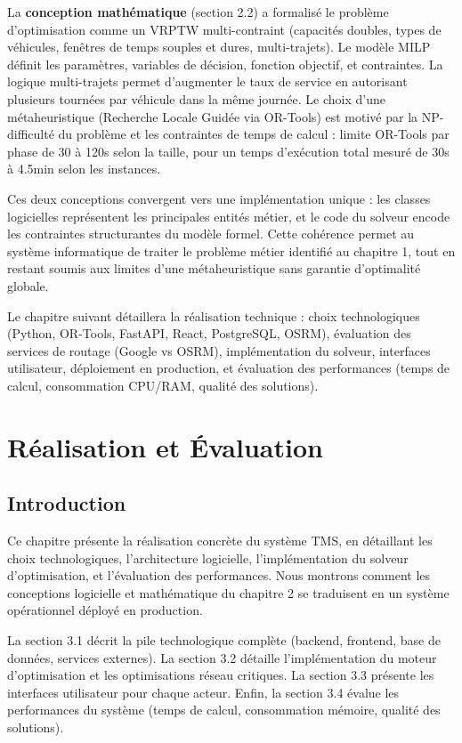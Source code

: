 \documentclass[12pt,a4paper]{report}
\begin{document}
La \textbf{conception mathématique} (section 2.2) a formalisé le problème d'optimisation comme un VRPTW multi-contraint (capacités doubles, types de véhicules, fenêtres de temps souples et dures, multi-trajets). Le modèle MILP définit les paramètres, variables de décision, fonction objectif, et contraintes. La logique multi-trajets permet d'augmenter le taux de service en autorisant plusieurs tournées par véhicule dans la même journée. Le choix d'une métaheuristique (Recherche Locale Guidée via OR-Tools) est motivé par la NP-difficulté du problème et les contraintes de temps de calcul : limite OR-Tools par phase de 30 à 120s selon la taille, pour un temps d'exécution total mesuré de 30s à 4.5min selon les instances.

Ces deux conceptions convergent vers une implémentation unique : les classes logicielles représentent les principales entités métier, et le code du solveur encode les contraintes structurantes du modèle formel. Cette cohérence permet au système informatique de traiter le problème métier identifié au chapitre 1, tout en restant soumis aux limites d'une métaheuristique sans garantie d'optimalité globale.

Le chapitre suivant détaillera la réalisation technique : choix technologiques (Python, OR-Tools, FastAPI, React, PostgreSQL, OSRM), évaluation des services de routage (Google vs OSRM), implémentation du solveur, interfaces utilisateur, déploiement en production, et évaluation des performances (temps de calcul, consommation CPU/RAM, qualité des solutions).

\chapter{Réalisation et Évaluation}

\section{Introduction}

Ce chapitre présente la réalisation concrète du système TMS, en détaillant les choix technologiques, l'architecture logicielle, l'implémentation du solveur d'optimisation, et l'évaluation des performances. Nous montrons comment les conceptions logicielle et mathématique du chapitre 2 se traduisent en un système opérationnel déployé en production.

La section 3.1 décrit la pile technologique complète (backend, frontend, base de données, services externes). La section 3.2 détaille l'implémentation du moteur d'optimisation et les optimisations réseau critiques. La section 3.3 présente les interfaces utilisateur pour chaque acteur. Enfin, la section 3.4 évalue les performances du système (temps de calcul, consommation mémoire, qualité des solutions).
\end{document}
